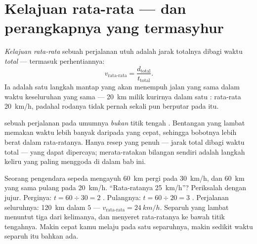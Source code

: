 \section{Kelajuan rata-rata --- dan perangkapnya yang termasyhur}

\begin{definition}\label{def:g7:motion-average-speed:average}
\emph{Kelajuan rata-rata} sebuah perjalanan
utuh adalah jarak totalnya dibagi waktu \emph{total} --- termasuk
perhentiannya:
\[
v_{\text{rata-rata}} = \frac{d_{\text{total}}}{t_{\text{total}}}.
\]
Ia adalah satu langkah mantap yang akan menempuh jalan yang sama dalam
waktu keseluruhan yang sama --- \qty{20}{km} milik kurirnya dalam satu
: rata-rata \qty{20}{km/h}, padahal rodanya tidak pernah sekali pun
berputar pada  itu.
\end{definition}

\begin{proposition}[Perangkapnya]\label{prop:g7:motion-average-speed:trap}
 sebuah perjalanan pada umumnya \emph{bukan} titik
tengah . Bentangan yang lambat memakan waktu lebih banyak
daripada yang cepat, sehingga bobotnya lebih berat dalam
rata-ratanya. Hanya resep yang penuh --- jarak total dibagi waktu
total --- yang dapat dipercaya; merata-ratakan bilangan 
sendiri adalah langkah keliru yang paling menggoda di dalam bab ini.
\end{proposition}

\begin{example}\label{ex:g7:motion-average-speed:sprung}
Seorang pengendara sepeda mengayuh \qty{60}{km} pergi pada
\qty{30}{km/h}, dan \qty{60}{km} yang sama pulang pada \qty{20}{km/h}.
``Rata-ratanya \qty{25}{km/h}''? Periksalah dengan jujur. Perginya:
$t = 60 \div 30 = 2$ . Pulangnya: $t = 60 \div 20 = 3$ .
Perjalanan seluruhnya: \qty{120}{km} dalam $5$  ---
$v_{\text{rata-rata}} = \qty{24}{km/h}$. Separuh yang lambat menuntut
tiga  dari kelimanya, dan menyeret rata-ratanya ke bawah titik
tengahnya. Makin cepat kamu melaju pada satu separuhnya, makin sedikit
waktu separuh itu bahkan ada.
\end{example}


